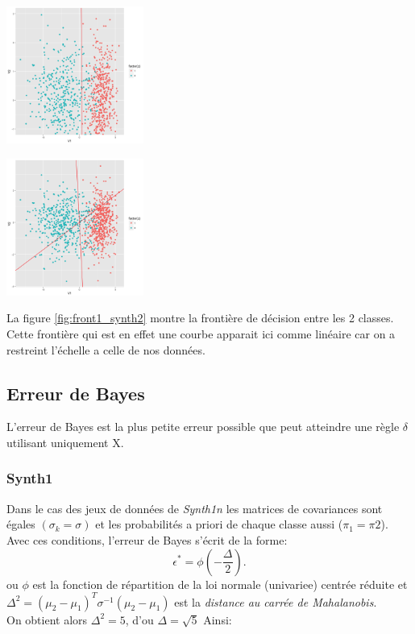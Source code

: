 \documentclass[10pt]{article}
\begin{document}
\begin{minipage}{.5\textwidth}
	\includegraphics[width=45mm]{Figures/Exo2/curve_synth2.png}
	\label{fig:front1_synth2}
\end{minipage}%
\hspace{0.02\linewidth}
\begin{minipage}{.5\textwidth}
	\includegraphics[width=45mm]{Figures/Exo2/linear2_synth2.png}
	\label{fig:front2_synth2}
\end{minipage}
\vspace{0.2mm}
La figure \ref{fig:front1_synth2} montre la frontière de décision entre les 2 classes. Cette frontière qui est en effet une courbe apparait ici comme linéaire car on a restreint l'échelle a celle de nos données.

\subsection{Erreur de Bayes}
L'erreur de Bayes  est la plus petite erreur possible que peut atteindre une règle $\delta$ utilisant uniquement X. 
\subsubsection{Synth1}
Dans le cas des jeux de données de \textit{Synth1n} les matrices de covariances sont égales $(\sigma_{k} = \sigma)$ et les probabilités a priori de chaque classe aussi  ($\pi_{1} = \pi{2}$). Avec ces conditions, l'erreur de Bayes s'écrit de la forme: \[ \epsilon^{*} = \phi(-\frac{\Delta}{2}) . \]
ou $\phi$ est la fonction de répartition de la loi normale (univariee) centrée réduite  et $ \Delta^{2}   = (\mu_{2} - \mu_{1})^{T} \sigma^{-1} (\mu_{2}  - \mu_{1})$ est la \textit{distance au carrée de Mahalanobis}.\\
On obtient alors $\Delta^{2} = 5$, d'ou $\Delta = \sqrt{5} $ Ainsi: 
\end{document}
